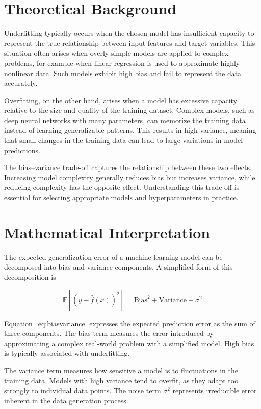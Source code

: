 \documentclass{article}
\begin{document}
\section{Theoretical Background}
\label{sec:theory}

Underfitting typically occurs when the chosen model has insufficient capacity to
represent the true relationship between input features and target variables. This
situation often arises when overly simple models are applied to complex problems,
for example when linear regression is used to approximate highly nonlinear data.
Such models exhibit high bias and fail to represent the data accurately.

Overfitting, on the other hand, arises when a model has excessive capacity relative
to the size and quality of the training dataset. Complex models, such as deep neural
networks with many parameters, can memorize the training data instead of learning
generalizable patterns. This results in high variance, meaning that small changes
in the training data can lead to large variations in model predictions.

The bias--variance trade-off captures the relationship between these two effects.
Increasing model complexity generally reduces bias but increases variance, while
reducing complexity has the opposite effect. Understanding this trade-off is
essential for selecting appropriate models and hyperparameters in practice.

\section{Mathematical Interpretation}
\label{sec:math}

The expected generalization error of a machine learning model can be decomposed
into bias and variance components. A simplified form of this decomposition is

\begin{equation}
\mathbb{E}\left[(y - \hat{f}(x))^2\right]
= \text{Bias}^2 + \text{Variance} + \sigma^2
\label{eq:biasvariance}
\end{equation}

Equation~\ref{eq:biasvariance} expresses the expected prediction error as the sum
of three components. The bias term measures the error introduced by approximating
a complex real-world problem with a simplified model. High bias is typically
associated with underfitting.

The variance term measures how sensitive a model is to fluctuations in the
training data. Models with high variance tend to overfit, as they adapt too
strongly to individual data points. The noise term $\sigma^2$ represents
irreducible error inherent in the data generation process.
\end{document}
